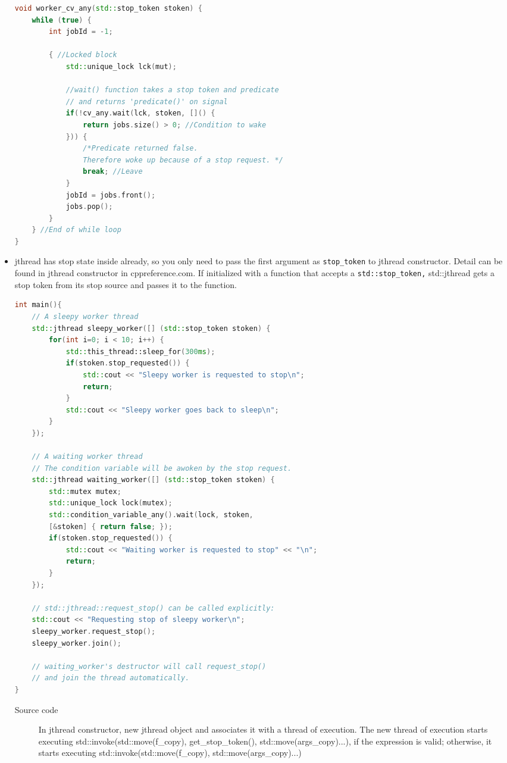 \documentclass[a4paper,11pt,twoside]{book}
\begin{document}
\begin{itemize}
\begin{lstlisting}[frame=single, language=c++]
void worker_cv_any(std::stop_token stoken) {
	while (true) {
		int jobId = -1;
		
		{ //Locked block
			std::unique_lock lck(mut);
			
			//wait() function takes a stop token and predicate
			// and returns 'predicate()' on signal
			if(!cv_any.wait(lck, stoken, []() {
				return jobs.size() > 0; //Condition to wake
			})) {
				/*Predicate returned false.
				Therefore woke up because of a stop request. */
				break; //Leave
			}
			jobId = jobs.front();
			jobs.pop();
		}
	} //End of while loop
}	
\end{lstlisting}

\item jthread has stop state inside already, so you only need to pass the first argument as \texttt{stop\_token} to jthread constructor.  Detail can be found in jthread constructor in cppreference.com.  If initialized with a function that accepts a \texttt{std::stop\_token,} std::jthread gets a stop token from its stop source and passes it to the function.

\begin{lstlisting}[frame=single, language=c++]
int main(){
	// A sleepy worker thread
	std::jthread sleepy_worker([] (std::stop_token stoken) {
		for(int i=0; i < 10; i++) {
			std::this_thread::sleep_for(300ms);
			if(stoken.stop_requested()) {
				std::cout << "Sleepy worker is requested to stop\n";
				return;
			}
			std::cout << "Sleepy worker goes back to sleep\n";
		}
	});
	
	// A waiting worker thread
	// The condition variable will be awoken by the stop request.
	std::jthread waiting_worker([] (std::stop_token stoken) {
		std::mutex mutex;
		std::unique_lock lock(mutex);
		std::condition_variable_any().wait(lock, stoken,
		[&stoken] { return false; });
		if(stoken.stop_requested()) {
			std::cout << "Waiting worker is requested to stop" << "\n";
			return;
		}
	});
	
	// std::jthread::request_stop() can be called explicitly:
	std::cout << "Requesting stop of sleepy worker\n";
	sleepy_worker.request_stop();
	sleepy_worker.join();
	
	// waiting_worker's destructor will call request_stop()
	// and join the thread automatically.
}
\end{lstlisting}
\begin{description}
		\item[Source code] In jthread constructor, new jthread object and associates it with a thread of execution. The new thread of execution starts executing std::invoke(std::move(f\_copy), get\_stop\_token(), std::move(args\_copy)...), if the expression is valid; otherwise, it starts executing std::invoke(std::move(f\_copy), std::move(args\_copy)...)
\end{description}
 

\end{itemize}
\end{document}
